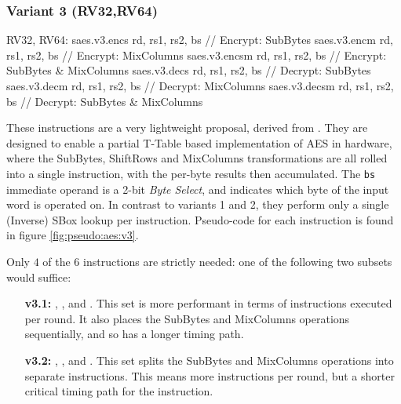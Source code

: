 
\newpage
\subsubsection{Variant 3 (RV32,RV64)}

\begin{cryptoisa}
RV32, RV64:
    saes.v3.encs      rd, rs1, rs2, bs // Encrypt: SubBytes
    saes.v3.encm      rd, rs1, rs2, bs // Encrypt: MixColumns
    saes.v3.encsm     rd, rs1, rs2, bs // Encrypt: SubBytes & MixColumns
    saes.v3.decs      rd, rs1, rs2, bs // Decrypt: SubBytes
    saes.v3.decm      rd, rs1, rs2, bs // Decrypt: MixColumns
    saes.v3.decsm     rd, rs1, rs2, bs // Decrypt: SubBytes & MixColumns
\end{cryptoisa}

These instructions are a very lightweight proposal, derived from
\cite{MJS:20}.
They are designed to enable a partial T-Table based implementation
of AES in hardware, where the SubBytes, ShiftRows and MixColumns
transformations are all rolled into a single instruction, with the
per-byte results then accumulated.
The {\tt bs} immediate operand is a 2-bit {\em Byte Select}, and indicates
which byte of the input word is operated on.
In contrast to variants 1 and 2, they perform only a single (Inverse) SBox
lookup per instruction.
Pseudo-code for each instruction is found in figure
\ref{fig:pseudo:aes:v3}.

Only $4$ of the $6$ instructions are strictly needed: one of the following two
subsets would suffice:
\begin{enumerate}
\item[{\bf v3.1:}]  ,
                    ,
                     and
                    .
    This set is more performant in terms of instructions executed per
    round.
    It also places the SubBytes and MixColumns operations
    sequentially, and so has a longer timing path.
\item[{\bf v3.2:}]  ,
                    ,
                     and
                    .
    This set splits the SubBytes and MixColumns operations into separate
    instructions.
    This means more instructions per round, but a shorter critical
    timing path for the instruction.
\end{enumerate}

